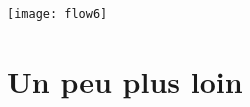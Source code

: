 \documentclass[12pt,a4paper]{article}
\begin{document}
\vspace{1cm}


\texttt{[image: flow6]}

\newpage















\section{Un peu plus loin}
\end{document}
